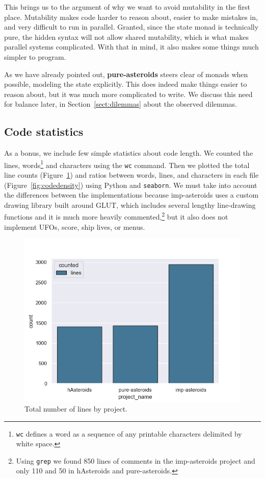 \documentclass[
  digital, %
  color,   %
  table,   %
  oneside, %
  lof,     %
  lot,     %
]{fithesis3}
\newcommand{\packagename}{\texttt}
\begin{document}
{This brings us to the argument of why we want to avoid mutability in the first place.
Mutability makes code harder to reason about, easier to make mistakes in, and
very difficult to run in parallel. Granted, since the state monad is technically
pure, the hidden syntax will not allow shared mutability,
which is what makes parallel systems complicated.
With that in mind, it also makes some things much simpler to program.

As we have already pointed out, \textbf{pure-asteroids} steers clear of monads when possible,
modeling the state explicitly. This does indeed make things easier to reason about,
but it was much more complicated to write.
We discuss this need for balance later, in Section~\ref{sect:dilemmas} about the observed dilemmas.



\subsection{Code statistics}
\label{sect:codestats}

As a bonus, we include few simple statistics about code length.
We counted the lines, words\footnote{
\texttt{wc} defines a word
as a sequence of any printable characters delimited by white space.
}
and characters using the \texttt{wc} command.
Then we plotted the total line counts (Figure~\ref{fig:codelength}) and
ratios between words, lines, and characters in each file (Figure~\ref{fig:codedensity})
using Python and \packagename{seaborn}. We must take into account the differences between
the implementations because imp-asteroids uses a custom drawing library
built around GLUT, which includes several lengthy line-drawing functions and
it is much more heavily commented,\footnote{
Using \texttt{grep} we found 850 lines of comments in the imp-asteroids project
and only 110 and 50 in hAsteroids and pure-asteroids.
}
but it also does not implement UFOs, score, ship lives, or menus.

\begin{figure}[H]
    \centering
    \includegraphics[width=0.9 \textwidth]{images/total_lines_by_project.png}
    \caption{Total number of lines by project.}
    \label{fig:codelength}
\end{figure}

}
\end{document}
